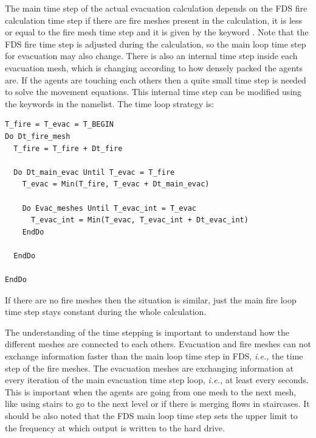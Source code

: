 \documentclass[12pt,a4paper,final,twoside]{stylevk}
\begin{document}
The main time step of the actual evacuation calculation depends on the
FDS fire calculation time step if there are fire meshes present in the
calculation, it is less or equal to the fire mesh time step and it is
given by the keyword .  Note that the
FDS fire time step is adjusted during the calculation, so the main
loop time step for evacuation may also change.  There is also an
internal time step inside each evacuation mesh, which is changing
according to how densely packed the agents are.  If the agents are
touching each others then a quite small time step is needed to solve
the movement equations.  This internal time step can be modified using
the keywords in the  namelist.  The time loop strategy is:
\begin{verbatim}
T_fire = T_evac = T_BEGIN
Do Dt_fire_mesh
  T_fire = T_fire + Dt_fire

  Do Dt_main_evac Until T_evac = T_fire
    T_evac = Min(T_fire, T_evac + Dt_main_evac)

    Do Evac_meshes Until T_evac_int = T_evac
      T_evac_int = Min(T_evac, T_evac_int + Dt_evac_int)
    EndDo

  EndDo

EndDo
\end{verbatim}
If there are no fire meshes then the situation is similar, just the
main fire loop time step stays constant during the whole calculation.


The understanding of the time stepping is important to understand how
the different meshes are connected to each others.  Evacuation and
fire meshes can not exchange information faster than the main loop
time step in FDS, \emph{i.e.,} the time step of the fire meshes.  The
evacuation meshes are exchanging information at every iteration of the
main evacuation time step loop, \emph{i.e.,} at least every
 seconds.  This is important when the
agents are going from one mesh to the next mesh, like using stairs to
go to the next level or if there is merging flows in staircases.  It
should be also noted that the FDS main loop time step sets the upper
limit to the frequency at which output is written to the hard drive.
\end{document}
